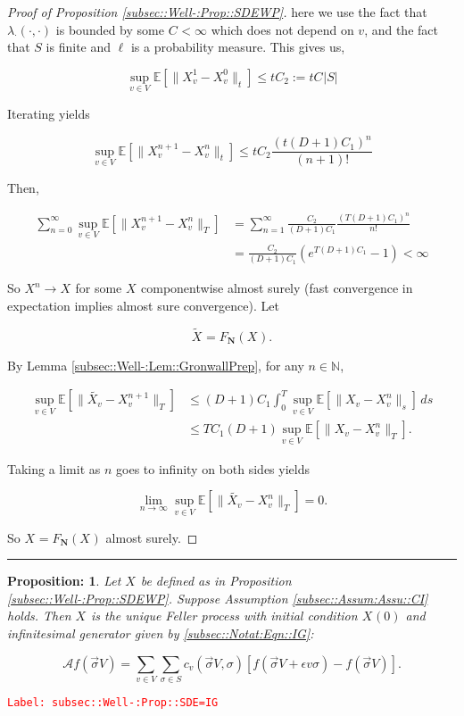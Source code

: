 \documentclass[12pt]{article}
\newcommand{\mb}{\mathbb}
\newcommand{\mc}{\mathcal}
\newcommand{\ra}{\rightarrow}
\newcommand{\ep}{\epsilon}
\newcommand{\tr}{\textcolor{red}}
\newcommand{\labe}[1]{\tr{\texttt{Label: #1}}}
\newcommand{\lin}{\rule{\linewidth}{0.4 pt}}
\newcommand{\ex}[1]{\mb{E}\left[#1\right]}			%
\newcommand{\defeq}{:=}								%
\renewcommand{\v}{v}							%
\renewcommand{\S}{S}							%
\newcommand{\s}{\sigma}							%
\newcommand{\sv}{\vec{\s}}						%
\newcommand{\ev}{\ep}							%
\newcommand{\T}{T}								%
\renewcommand{\t}{t}							%
\newcommand{\degr}{D}								%
\newcommand{\poisses}{\mathbf{N}}				%
\newcommand{\IG}{\mc{A}}						%
\newcommand{\V}{V}									%
\renewcommand{\tt}{s}								%
\newcommand{\numb}{n}								%
\newcommand{\XState}[1]{\S^{#1}}				%
\newcommand{\rxvt}[2]{X_{#1}{(#2)}}					%
\newcommand{\rxvts}[2]{X_{#1}{#2}}					%
\newcommand{\rxvtsn}[3]{X_{#1}^{#3}{#2}}			%
\newcommand{\IGr}[1]{c_{#1}}						%
\newcommand{\rate}[1]{\lambda_{#1}}					%
\newcommand{\const}[1]{C_{#1}}						%
\newcommand{\Sm}{\ell}								%
\newcommand{\alt}{\widetilde}						%
\newtheorem{prop}[thms]{Proposition: }
\begin{document}
\begin{proof}[Proof of Proposition \ref{subsec::Well-:Prop::SDEWP}]
here we use the fact that \(\rate{\cdot}(\cdot,\cdot)\) is bounded by some \(\const{} < \infty\) which does not depend on \(\v\), and the fact that \(\S\) is finite and \(\Sm\) is a probability measure. This gives us,

\[\sup_{\v \in \V}\ex{\|\rxvtsn{\v}{}{1} - \rxvtsn{\v}{}{0}\|_\t} \leq \t\const{2} \defeq \t\const{}|\S|\]

Iterating yields

\[\sup_{\v \in \V} \ex{\|\rxvtsn{\v}{}{\numb+1} - \rxvtsn{\v}{}{\numb}\|_\t} \leq \t\const{2}\frac{(\t(\degr+1)\const{1})^\numb}{(\numb+1)!}\]

Then,

\begin{align*}
\sum_{\numb=0}^\infty \sup_{\v \in \V} \ex{\|\rxvtsn{\v}{}{\numb+1} - \rxvtsn{\v}{}{\numb}\|_\T} &= \sum_{\numb=1}^\infty \frac{\const{2}}{(\degr+1)\const{1}}\frac{(\T(\degr+1)\const{1})^{\numb}}{\numb !}\\
& = \frac{\const{2}}{(\degr+1)\const{1}}(e^{\T(\degr+1)\const{1}} - 1) < \infty
\end{align*}


So \(\rxvtsn{}{}{\numb} \ra \rxvts{}{}\) for some \(\rxvts{}{}\) componentwise almost surely (fast convergence in expectation implies almost sure convergence). Let 

\[\alt{\rxvts{}{}} = F_\poisses(\rxvts{}{}).\]

By Lemma \ref{subsec::Well-:Lem::GronwallPrep}, for any \(\numb\in\mb{N}\),

\begin{align*}
\sup_{\v \in \V} \ex{\|\alt{\rxvts{\v}{}} - \rxvtsn{\v}{}{\numb+1}\|_\T} &\leq (\degr+1)\const{1}\int_0^\T \sup_{\v \in \V}\ex{\|\rxvts{\v}{} - \rxvtsn{\v}{}{\numb}\|_\tt}\,d\tt \\
&\leq \T\const{1}(\degr+1)\sup_{\v\in \V} \ex{\|\rxvts{\v}{} - \rxvtsn{\v}{}{\numb}\|_\T}.
\end{align*}

Taking a limit as \(\numb\) goes to infinity on both sides yields

\[\lim_{\numb\ra\infty} \sup_{\v \in \V} \ex{\|\alt{\rxvts{\v}{}} - \rxvtsn{\v}{}{\numb}\|_\T} = 0.\]

So \(\rxvts{}{}= F_\poisses(\rxvts{}{})\) almost surely.
\end{proof}

\lin

\begin{prop}
Let \(\rxvts{}{}\) be defined as in Proposition \ref{subsec::Well-:Prop::SDEWP}. Suppose Assumption \ref{subsec::Assum:Assu::CI} holds. Then \(\rxvts{}{}\) is the unique Feller process with initial condition \(\rxvt{}{0}\) and infinitesimal generator given by \eqref{subsec::Notat:Eqn::IG}:

\[\IG f(\sv{}{\V}) = \sum_{\v\in \V}\sum_{\s \in \S} \IGr{\v}(\sv{}{\V},\s)[f(\sv{}{\V} + \ev{\v}\s) - f(\sv{}{\V})].\]
\label{subsec::Well-:Prop::SDE=IG}
\end{prop}
\labe{subsec::Well-:Prop::SDE=IG}
\end{document}
